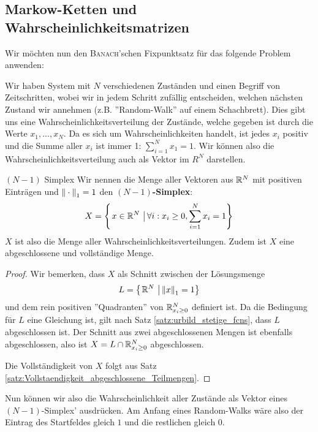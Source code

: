 \subsection{Markow-Ketten und Wahrscheinlichkeitsmatrizen}
Wir möchten nun den \textsc{Banach}'schen Fixpunktsatz für das folgende Problem anwenden:

Wir haben System mit $N$ verschiedenen Zuständen und einen Begriff von Zeitschritten, wobei wir in jedem Schritt zufällig entscheiden, welchen nächsten Zustand wir annehmen (z.B. ''Random-Walk'' auf einem Schachbrett). Dies gibt uns eine Wahrscheinlichkeitsverteilung der Zustände, welche gegeben ist durch die Werte $x_1, ..., x_N$. Da es sich um Wahrscheinlichkeiten handelt, ist jedes $x_i$ positiv und die Summe aller $x_i$ ist immer 1: $\sum_{i=1}^N x_1 = 1$. Wir können also die Wahrscheinlichkeitsverteilung auch als Vektor im $R^N$ darstellen.

\begin{definition}{$(N-1)$ Simplex}{}
Wir nennen die Menge aller Vektoren aus $\mathbb{R}^N$ mit positiven Einträgen und $\left\|\:\cdot\:\right\|_1 = 1$ den \textbf{$(N-1)$-Simplex}:
$$X = \left\{\left.x \in \mathbb{R}^N \ \right| \forall i: x_i \geq 0, \sum_{i=1}^N x_i = 1 \right\}$$
$X$ ist also die Menge aller Wahrscheinlichkeitsverteilungen. Zudem ist $X$ eine abgeschlossene und vollständige Menge. 
\end{definition}
\begin{proof}
Wir bemerken, dass $X$ als Schnitt zwischen der Lösungsmenge $$L = \left\{\left.\mathbb{R}^N \ \right| \left\|x\right\|_1 = 1 \right\}$$ und dem rein positiven ''Quadranten'' von $\mathbb{R}^N_{x_i \geq 0}$ definiert ist. Da die Bedingung für $L$ eine Gleichung ist, gilt nach Satz \ref{satz:urbild_stetige_fcns}, dass $L$ abgeschlossen ist. Der Schnitt aus zwei abgeschlossenen Mengen ist ebenfalls abgeschlossen, also ist $X = L \cap \mathbb{R}^N_{x_i \geq 0}$ abgeschlossen.

Die Vollständigkeit von $X$ folgt aus Satz \ref{satz:Vollstaendigkeit_abgeschlossene_Teilmengen}.
\end{proof}

Nun können wir also die Wahrscheinlichkeit aller Zustände als Vektor eines $(N-1)$-Simplex' ausdrücken. Am Anfang eines Random-Walks wäre also der Eintrag des Startfeldes gleich $1$ und die restlichen gleich 0.

